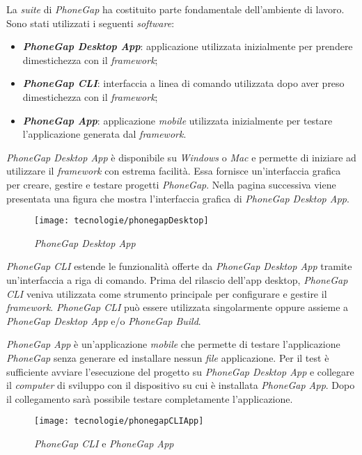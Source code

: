 La \textit{suite} di \textit{PhoneGap} ha costituito parte fondamentale dell'ambiente di lavoro. Sono stati utilizzati i seguenti \textit{software}:
\begin{itemize}
	\item \textbf{\textit{PhoneGap Desktop App}}: applicazione utilizzata inizialmente per prendere dimestichezza con il \textit{framework};
	\item \textbf{\textit{PhoneGap CLI}}: interfaccia a linea di comando utilizzata dopo aver preso dimestichezza con il \textit{framework};
	\item \textbf{\textit{PhoneGap App}}: applicazione \textit{mobile} utilizzata inizialmente per testare l'applicazione generata dal \textit{framework}.
\end{itemize}

\textit{PhoneGap Desktop App} è disponibile su \textit{Windows} o \textit{Mac} e permette di iniziare ad utilizzare il \textit{framework} con estrema facilità. Essa fornisce un'interfaccia grafica per creare, gestire e testare progetti \textit{PhoneGap}. Nella pagina successiva viene presentata una figura che mostra l'interfaccia grafica di \textit{PhoneGap Desktop App}.

\begin{figure}[!h] 
    \centering 
    \texttt{[image: tecnologie/phonegapDesktop]} 
    \caption{\textit{PhoneGap Desktop App}}
\end{figure}

\newpage

\textit{PhoneGap CLI} estende le funzionalità offerte da \textit{PhoneGap Desktop App} tramite un'interfaccia a riga di comando. Prima del rilascio dell'app desktop, \textit{PhoneGap CLI} veniva utilizzata come strumento principale per configurare e gestire il \textit{framework}. \textit{PhoneGap CLI} può essere utilizzata singolarmente oppure assieme a \textit{PhoneGap Desktop App} e/o \textit{PhoneGap Build}.

\textit{PhoneGap App} è un'applicazione \textit{mobile} che permette di testare l'applicazione \textit{PhoneGap} senza generare ed installare nessun \textit{file} applicazione. Per il test è sufficiente avviare l'esecuzione del progetto su \textit{PhoneGap Desktop App} e collegare il \textit{computer} di sviluppo con il dispositivo su cui è installata \textit{PhoneGap App}. Dopo il collegamento sarà possibile testare completamente l'applicazione.

\begin{figure}[!h] 
    \centering 
    \texttt{[image: tecnologie/phonegapCLIApp]} 
    \caption{\textit{PhoneGap CLI} e \textit{PhoneGap App}}
\end{figure}

